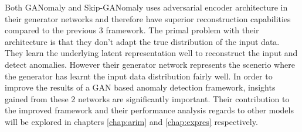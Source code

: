 Both GANomaly and Skip-GANomaly uses adversarial encoder architecture in their generator networks
and therefore have superior reconstruction capabilities compared to the previous 3 framework. The
primal problem with their architecture is that they don't adapt the true distribution of the input
data. They learn the underlying latent representation well to reconstruct the input and detect
anomalies. However their generator network represents the scenerio where the generator has learnt the
input data distribution fairly well. In order to improve the results of a GAN based anomaly
detection framework, insights gained from these 2 networks are significantly important. Their
contribution to the improved framework and their performance analysis regards to other models will
be explored in chapters \ref{chap:arim} and \ref{chap:expres} respectively. 
\endgroup
